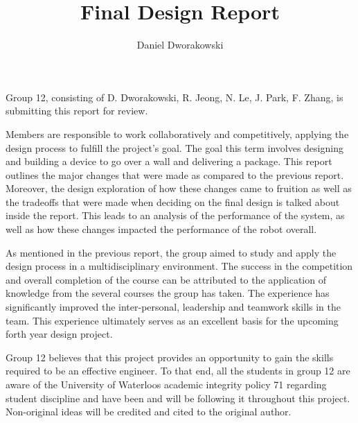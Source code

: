 \documentclass[ece]{uw-wkrpt}
\begin{document}

\title{Final Design Report}
\author{Daniel Dworakowski}
\address{University of Waterloo,\\*
        Waterloo, ON\ \ N2L 3G1}
\employeraddress{}
\maketitle

\frontmatter

% 
\begin{letter}
Group 12, consisting of D. Dworakowski, R. Jeong, N. Le, J. Park, F. Zhang, is submitting this report for review.

Members are responsible to work collaboratively and competitively, applying the design process to fulfill the project’s goal. The goal this term involves designing and building a device to go over a wall and delivering a package. This report outlines the major changes that were made as compared to the previous report. Moreover, the design exploration of how these changes came to fruition as well as the tradeoffs that were made when deciding on the final design is talked about inside the report. This leads to an analysis of the performance of the system, as well as how these changes impacted the performance of the robot overall.

As mentioned in the previous report, the group aimed to study and apply the design process in a multidisciplinary environment. The success in the competition and overall completion of the course can be attributed to the application of knowledge from the several courses the group has taken. The experience has significantly improved the inter-personal, leadership and teamwork skills in the team. This experience ultimately serves as an excellent basis for the upcoming forth year design project. 

Group 12 believes that this project provides an opportunity to gain the skills required to be an effective engineer. To that end, all the students in group 12 are aware of the University of Waterloo\textsc{}s academic integrity policy 71 regarding \textsc{}student discipline\textsc{} and have been and will be following it throughout this project. Non-original ideas will be credited and cited to the original author.

\end{letter}
% 
\end{document}
